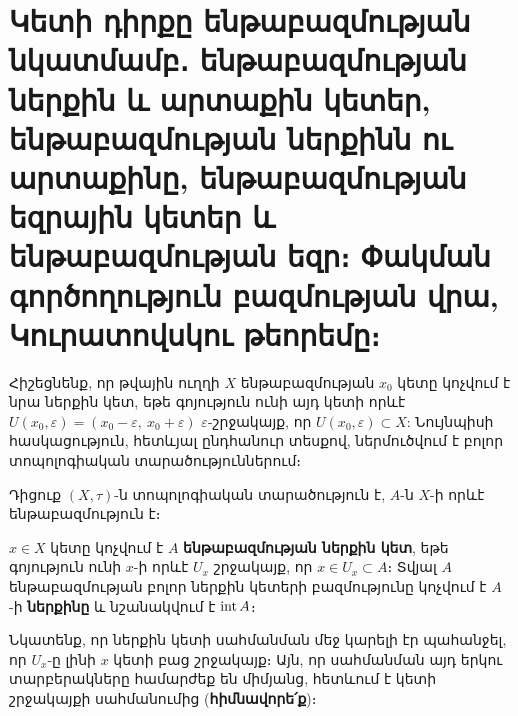 \documentclass[./main.tex]{subfiles}
\begin{document}
\onehalfspacing


\section{Կետի դիրքը ենթաբազմության նկատմամբ․ ենթա\-բազ\-մու\-թյան ներքին և արտա\-քին կետեր, ենթա\-բազ\-մու\-թյան ներքինն ու արտա\-քինը, ենթա\-բազ\-մու\-թյան եզրա\-յին կետեր և ենթա\-բազ\-մության եզր։ Փակման գոր\-ծո\-ղու\-թյուն բազ\-մու\-թյան վրա, Կուրա\-տովս\-կու թեո\-րեմը։}\label{sec:6}

\par Հիշեցնենք, որ թվային ուղղի $X$ ենթաբազմության $x_0$ կետը կոչվում է նրա ներքին կետ, եթե գոյություն ունի այդ կետի որևէ $U(x_0, \varepsilon) = (x_0 - \varepsilon,\ x_0 + \varepsilon)$ $\varepsilon$-շրջակայք, որ $U(x_0, \varepsilon) \subset X$: Նույնպիսի հասկացություն, հետևյալ ընդհանուր տեսքով, ներմուծվում է բոլոր տոպոլոգիական տարածություններում։

\par Դիցուք $(X, \tau)$-ն տոպոլոգիական տարածություն է, $A$-ն $X$-ի որևէ ենթաբազմու\-թյուն է։

\begin{definition}
$x \in X$ կետը կոչվում է $A$ \textbf{ենթաբազմության ներքին կետ}, եթե գոյություն ունի $x$-ի որևէ $U_x$ շրջակայք, որ $x\in U_x \subset A$։ Տվյալ $A$ ենթաբազմության բոլոր ներքին կետերի բազմությունը կոչվում է $A$-ի \textbf{ներքինը} և նշանակվում է $\operatorname{int} A$։
\end{definition}

\par Նկատենք, որ ներքին կետի սահմանման մեջ կարելի էր պահանջել, որ $U_x$-ը լինի $x$ կետի բաց շրջակայք։ Այն, որ սահմանման այդ երկու տարբերակները համարժեք են միմյանց, հետևում է կետի շրջակայքի սահմանումից (\textbf{հիմնավորե՛ք})։
\end{document}
